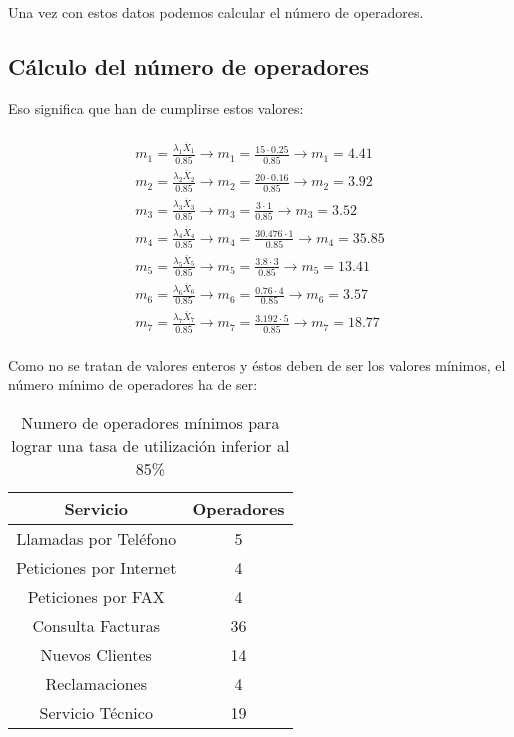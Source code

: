 Una vez con estos datos podemos calcular el número de operadores.

\subsection{Cálculo del número de operadores}
Eso significa que han de cumplirse estos valores:

\begin{multline}\\
  m_{1} = \frac{\lambda_{1}\overline{X}_{1}}{0.85} \rightarrow m_{1} = \frac{15\cdot 0.25}{0.85} \rightarrow m_{1} = 4.41 \\
  m_{2} = \frac{\lambda_{2}\overline{X}_{2}}{0.85} \rightarrow m_{2} = \frac{20\cdot 0.16}{0.85} \rightarrow m_{2} = 3.92\\
  m_{3} = \frac{\lambda_{3}\overline{X}_{3}}{0.85} \rightarrow m_{3} = \frac{3\cdot 1}{0.85} \rightarrow m_{3} = 3.52\\
  m_{4} = \frac{\lambda_{4}\overline{X}_{4}}{0.85} \rightarrow m_{4} = \frac{30.476\cdot 1}{0.85} \rightarrow m_{4} = 35.85\\
  m_{5} = \frac{\lambda_{5}\overline{X}_{5}}{0.85} \rightarrow m_{5} = \frac{3.8\cdot 3}{0.85} \rightarrow m_{5} = 13.41\\
  m_{6} = \frac{\lambda_{6}\overline{X}_{6}}{0.85} \rightarrow m_{6} = \frac{0.76\cdot 4}{0.85} \rightarrow m_{6} = 3.57\\
  m_{7} = \frac{\lambda_{7}\overline{X}_{7}}{0.85} \rightarrow m_{7} = \frac{3.192\cdot 5}{0.85} \rightarrow m_{7} = 18.77\\
\end{multline}

Como no se tratan de valores enteros y éstos deben de ser los valores mínimos, el número mínimo de operadores ha de ser:

\begin{table}[H]
  \begin{center}
  \begin{tabular}{|c|c|}
    \hline
    \textbf{Servicio}       & \textbf{Operadores} \\ \hline
    Llamadas por Teléfono   & 5                   \\ \hline
    Peticiones por Internet & 4                   \\ \hline
    Peticiones por FAX      & 4                   \\ \hline
    Consulta Facturas      & 36                   \\ \hline
    Nuevos Clientes      & 14                   \\ \hline
    Reclamaciones      & 4                   \\ \hline
    Servicio Técnico      & 19                   \\ \hline
  \end{tabular}
\end{center}
  \caption{Numero de operadores mínimos para lograr una tasa de utilización inferior al 85\%}
\end{table}

